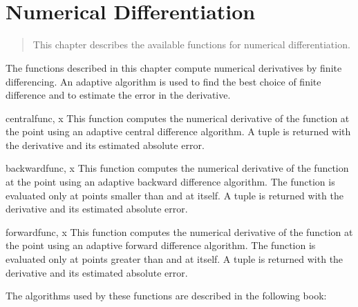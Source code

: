 \chapter[\protect\module{pygsl.diff} --- Numerical 
Differentiation]{\protect{} \\ Numerical Differentiation}
\label{cha:diff-module}


\begin{quote}
   This chapter describes the available functions for numerical
   differentiation.
\end{quote}

The functions described in this chapter compute numerical derivatives by finite
differencing.  An adaptive algorithm is used to find the best choice of finite
difference and to estimate the error in the derivative.


\begin{funcdesc}{central}{func, x}
   This function computes the numerical derivative of the function 
   at the point  using an adaptive central difference algorithm.  A
   tuple  is returned with the derivative and its
   estimated absolute error.
\end{funcdesc}

\begin{funcdesc}{backward}{func, x}
   This function computes the numerical derivative of the function 
   at the point  using an adaptive backward difference algorithm.  The
   function  is evaluated only at points smaller than  and at
    itself.  A tuple  is returned with the
   derivative and its estimated absolute error.
\end{funcdesc}

\begin{funcdesc}{forward}{func, x}
   This function computes the numerical derivative of the function 
   at the point  using an adaptive forward difference algorithm.  The
   function  is evaluated only at points greater than  and at
    itself.  A tuple  is returned with the
   derivative and its estimated absolute error.
\end{funcdesc}


\begin{seealso}
   The algorithms used by these functions are described in the following book:
\end{seealso}



